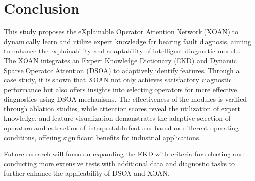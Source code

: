 \documentclass[lettersize,journal]{IEEEtran}
\begin{document}

\section{Conclusion}

This study proposes the eXplainable Operator Attention Network (XOAN) to dynamically learn and utilize expert knowledge for bearing fault diagnosis, aiming to enhance the explainability and adaptability of intelligent diagnostic models. The XOAN integrates an Expert Knowledge Dictionary (EKD) and Dynamic Sparse Operator Attention (DSOA) to adaptively identify features. Through a case study, it is shown that XOAN not only achieves satisfactory diagnostic performance but also offers insights into selecting operators for more effective diagnostics using DSOA mechanisms. The effectiveness of the modules is verified through ablation studies, while attention scores reveal the utilization of expert knowledge, and feature visualization demonstrates the adaptive selection of operators and extraction of interpretable features based on different operating conditions, offering significant benefits for industrial applications. 

Future research will focus on expanding the EKD with criteria for selecting and conducting more extensive tests with additional data and diagnostic tasks to further enhance the applicability of DSOA and XOAN.
















\end{document}
